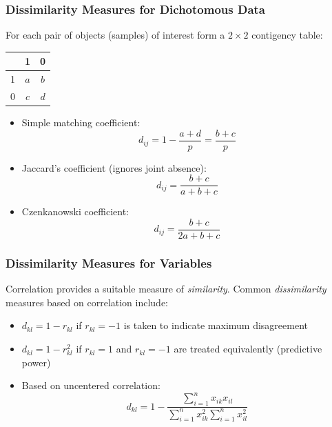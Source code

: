 \documentclass{beamer}
\begin{document}
\begin{frame}
  \frametitle{Dissimilarity Measures for Dichotomous Data}

For each pair of objects (samples) of interest form a $2 \times 2$ contigency table:

\begin{center}
\begin{tabular}{l|cc}
   & 1 & 0 \\
\midrule
1 & $a$ & $b$ \\
0 & $c$ & $d$ \\
\end{tabular}
\end{center}

\begin{itemize}

\item Simple matching coefficient: 
\[
d_{ij} = 1 - \frac{a + d}{p} = \frac{b + c}{p}
\]

\item Jaccard's coefficient (ignores joint absence):
\[
d_{ij} =  \frac{b + c}{a + b + c}
\]


\item Czenkanowski coefficient: 
\[
d_{ij} = \frac{b + c}{2a + b + c}
\]


\end{itemize}
\end{frame}

\begin{frame}
  \frametitle{Dissimilarity Measures for Variables}

Correlation provides a suitable measure of \emph{similarity}. Common \emph{dissimilarity} measures based on correlation include:


\begin{itemize}

\item $d_{kl} = 1 - r_{kl}$ if $r_{kl} = -1$ is taken to indicate maximum disagreement

\item $d_{kl} = 1 - r_{kl}^2$ if $r_{kl} = 1$ and $r_{kl} = -1$ are treated equivalently (predictive power)


\item Based on uncentered correlation:
\[
d_{kl} = 1 - \frac{\sum_{i=1}^n x_{ik}x_{il}} {\sum_{i=1}^n x_{ik}^2 \sum_{i=1}^n x_{il}^2}
\]

\end{itemize}
\end{frame}
\end{document}
